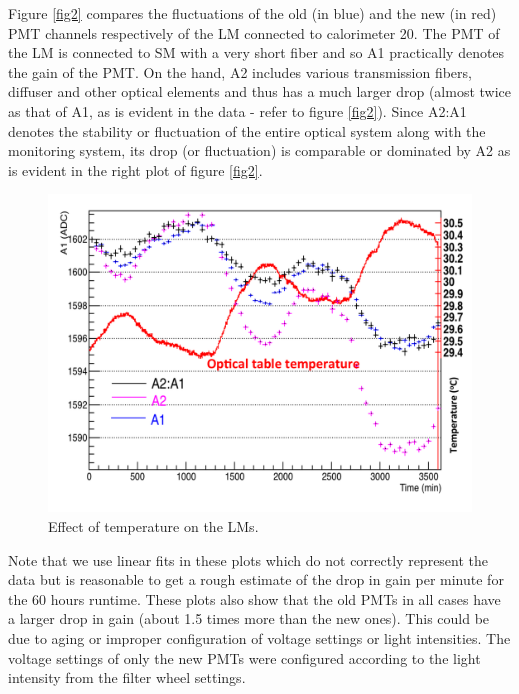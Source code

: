 \documentclass[article,accept,moreauthors,pdftex,10pt,a4paper]{Definitions/mdpi}
\begin{document}
Figure \ref{fig2} compares the fluctuations of 
the old (in blue) and the new (in red) PMT channels respectively of the LM connected to calorimeter 20. 
The PMT of the LM is connected to SM with a very short fiber and so A1 practically denotes the gain 
of the PMT. On the hand, A2 includes various transmission fibers, diffuser and other optical elements 
and thus has a much larger drop (almost twice as that of A1, as is evident in 
the data - refer to figure \ref{fig2}). Since A2:A1 denotes the stability or fluctuation of the entire optical 
system along with the monitoring system, its drop (or fluctuation) is comparable or dominated by A2 as is evident 
in the right plot of figure \ref{fig2}. 
\begin{figure}[H]
\centering
\includegraphics[width=9 cm]{temp_amp_60hr.pdf}
\caption{\label{fig3}Effect of temperature on the LMs.}
\end{figure} 
Note that we use linear fits in these plots which do not correctly 
represent the data but is reasonable to get a rough estimate of the drop in gain per minute for the 60 hours runtime. 
These plots also show that the old PMTs in all cases have a larger drop in gain (about 1.5 times more than the 
new ones). This could be due to aging or improper configuration of voltage settings or light intensities. 
The voltage settings of only the new PMTs were configured according to the light intensity from the filter wheel settings. 
\end{document}
